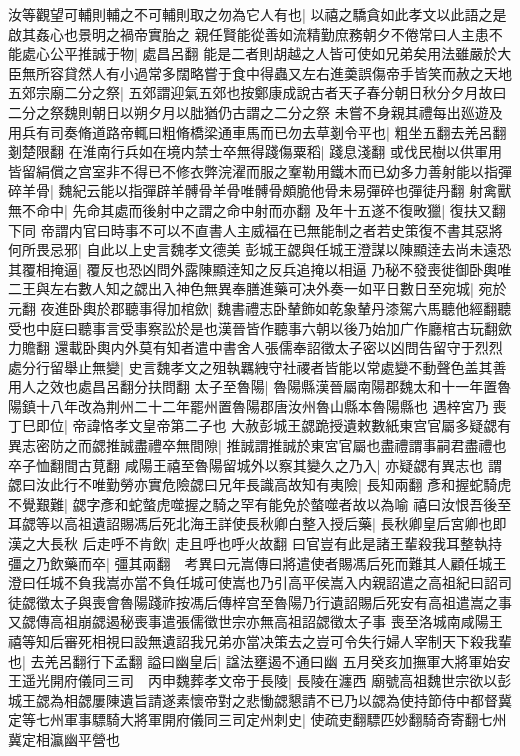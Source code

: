 汝等觀望可輔則輔之不可輔則取之勿為它人有也|{
	以禧之驕貪如此孝文以此語之是啟其姦心也景明之禍帝實胎之}
親任賢能從善如流精勤庶務朝夕不倦常曰人主患不能處心公平推誠于物|{
	處昌呂翻}
能是二者則胡越之人皆可使如兄弟矣用法雖嚴於大臣無所容貸然人有小過常多闊略嘗于食中得蟲又左右進羮誤傷帝手皆笑而赦之天地五郊宗廟二分之祭|{
	五郊謂迎氣五郊也按鄭康成說古者天子春分朝日秋分夕月故曰二分之祭魏則朝日以朔夕月以朏猶仍古謂之二分之祭}
未嘗不身親其禮每出廵遊及用兵有司奏脩道路帝輒曰粗脩橋梁通車馬而已勿去草剗令平也|{
	粗坐五翻去羌呂翻剗楚限翻}
在淮南行兵如在境内禁士卒無得踐傷粟稻|{
	踐息淺翻}
或伐民樹以供軍用皆留絹償之宫室非不得已不修衣弊浣濯而服之鞌勒用鐵木而已幼多力善射能以指彈碎羊骨|{
	魏紀云能以指彈辟羊髆骨羊骨唯髆骨頗脆他骨未易彈碎也彈徒丹翻}
射禽獸無不命中|{
	先命其處而後射中之謂之命中射而亦翻}
及年十五遂不復畋獵|{
	復扶又翻下同}
帝謂内官曰時事不可以不直書人主威福在已無能制之者若史策復不書其惡將何所畏忌邪|{
	自此以上史言魏孝文德美}
彭城王勰與任城王澄謀以陳顯逹去尚未遠恐其覆相掩逼|{
	覆反也恐凶問外露陳顯逹知之反兵追掩以相逼}
乃秘不發喪徙御卧輿唯二王與左右數人知之勰出入神色無異奉膳進藥可决外奏一如平日數日至宛城|{
	宛於元翻}
夜進卧輿於郡聽事得加棺歛|{
	魏書禮志卧輦飾如乾象輦丹漆駕六馬聽他經翻聽受也中庭曰聽事言受事察訟於是也漢晉皆作聽事六朝以後乃始加广作廳棺古玩翻歛力贍翻}
還載卧輿内外莫有知者遣中書舍人張儒奉詔徵太子密以凶問告留守于烈烈處分行留舉止無變|{
	史言魏孝文之殂執羈絏守社禝者皆能以常處變不動聲色盖其善用人之效也處昌呂翻分扶問翻}
太子至魯陽|{
	魯陽縣漢晉屬南陽郡魏太和十一年置魯陽鎮十八年改為荆州二十二年罷州置魯陽郡唐汝州魯山縣本魯陽縣也}
遇梓宮乃喪丁巳即位|{
	帝諱恪孝文皇帝第二子也}
大赦彭城王勰跪授遺敕數紙東宫官屬多疑勰有異志密防之而勰推誠盡禮卒無間隙|{
	推誠謂推誠於東宮官屬也盡禮謂事嗣君盡禮也卒子恤翻間古莧翻}
咸陽王禧至魯陽留城外以察其變久之乃入|{
	亦疑勰有異志也}
謂勰曰汝此行不唯勤勞亦實危險勰曰兄年長識高故知有夷險|{
	長知兩翻}
彥和握蛇騎虎不覺艱難|{
	勰字彥和蛇螫虎噬握之騎之罕有能免於螫噬者故以為喻}
禧曰汝恨吾後至耳勰等以高祖遺詔賜馮后死北海王詳使長秋卿白整入授后藥|{
	長秋卿皇后宮卿也即漢之大長秋}
后走呼不肯飲|{
	走且呼也呼火故翻}
曰官豈有此是諸王輩殺我耳整執持彊之乃飲藥而卒|{
	彊其兩翻　考異曰元嵩傳曰將遣使者賜馮后死而難其人顧任城王澄曰任城不負我嵩亦當不負任城可使嵩也乃引高平侯嵩入内親詔遣之高祖紀曰詔司徒勰徵太子與喪會魯陽踐祚按馮后傳梓宫至魯陽乃行遺詔賜后死安有高祖遣嵩之事又勰傳高祖崩勰遏秘喪事遣張儒徵世宗亦無高祖詔勰徵太子事}
喪至洛城南咸陽王禧等知后審死相視曰設無遺詔我兄弟亦當决策去之豈可令失行婦人宰制天下殺我輩也|{
	去羌呂翻行下孟翻}
謚曰幽皇后|{
	諡法壅遏不通曰幽}
五月癸亥加撫軍大將軍始安王遥光開府儀同三司　丙申魏葬孝文帝于長陵|{
	長陵在瀍西}
廟號高祖魏世宗欲以彭城王勰為相勰屢陳遺旨請遂素懷帝對之悲慟勰懇請不已乃以勰為使持節侍中都督冀定等七州軍事驃騎大將軍開府儀同三司定州刺史|{
	使疏吏翻驃匹妙翻騎奇寄翻七州冀定相瀛幽平營也}
